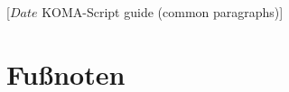 %
%
%
%
%
%
%
%
% 
%
%
%
%

%
                 [$Date$
                  KOMA-Script guide (common paragraphs)]

\section{Fußnoten}
%
\BeginIndexGroup
{}%

